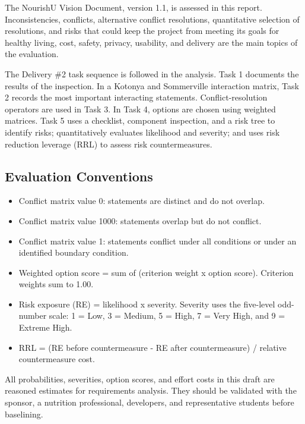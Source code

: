 \documentclass[11pt,a4paper]{article}
\begin{document}
The NourishU Vision Document, version 1.1, is assessed in this report. Inconsistencies, conflicts, alternative conflict resolutions, quantitative selection of resolutions, and risks that could keep the project from meeting its goals for healthy living, cost, safety, privacy, usability, and delivery are the main topics of the evaluation.

The Delivery \#2 task sequence is followed in the analysis. Task 1 documents the results of the inspection. In a Kotonya and Sommerville interaction matrix, Task 2 records the most important interacting statements. Conflict-resolution operators are used in Task 3. In Task 4, options are chosen using weighted matrices. Task 5 uses a checklist, component inspection, and a risk tree to identify risks; quantitatively evaluates likelihood and severity; and uses risk reduction leverage (RRL) to assess risk countermeasures.

\subsection{Evaluation Conventions}

\begin{itemize}

\item Conflict matrix value 0: statements are distinct and do not overlap.

\item Conflict matrix value 1000: statements overlap but do not conflict.

\item Conflict matrix value 1: statements conflict under all conditions or under an identified boundary condition.

\item Weighted option score = sum of (criterion weight x option score). Criterion weights sum to 1.00.

\item Risk exposure (RE) = likelihood x severity. Severity uses the five-level odd-number scale: 1 = Low, 3 = Medium, 5 = High, 7 = Very High, and 9 = Extreme High.

\item RRL = (RE before countermeasure - RE after countermeasure) / relative countermeasure cost.

\end{itemize}

All probabilities, severities, option scores, and effort costs in this draft are reasoned estimates for requirements analysis. They should be validated with the sponsor, a nutrition professional, developers, and representative students before baselining.
\end{document}
